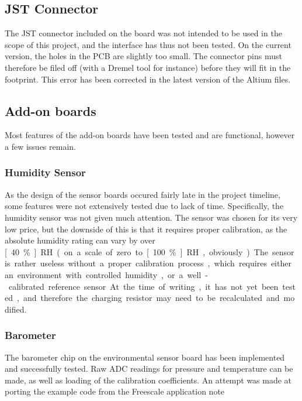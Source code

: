 \subsection{JST Connector}
The JST connector included on the board was not intended to be used in the scope
of this project, and the interface has thus not been tested. On the current
version, the holes in the PCB are slightly too small. The connector pins must
therefore be filed off (with a Dremel tool for instance) before they will fit in
the footprint. This error has been corrected in the latest version of the Altium
files.

\subsection{Add-on boards}
\label{sub:problems-sensors}
Most features of the add-on boards have been tested and are functional, however
a few issues remain.

\subsubsection{Humidity Sensor}
\label{sub2:humidity}
As the design of the sensor boards occured fairly late in the project timeline,
some features were not extensively tested due to lack of time. Specifically, the
humidity sensor was not given much attention. The sensor was chosen for its very
low price, but the downside of this is that it requires proper calibration, as
the absolute humidity rating can vary by over \unit[40\%]{RH} (on a scale of
zero to \unit[100\%]{RH}, obviously). The sensor is rather useless without a
proper calibration process, which requires either an environment with controlled
humidity, or a well-calibrated reference sensor. At the time of writing, it has
not yet been tested, and therefore the charging resistor may need to be
recalculated and modified.

\subsubsection{Barometer}
\label{sub2:barometer}
The barometer chip on the environmental sensor board has been implemented and
successfully tested. Raw ADC readings for pressure and temperature can be made,
as well as loading of the calibration coefficients. An attempt was made
at porting the example code from the Freescale application
note\cite{freescale3785}

